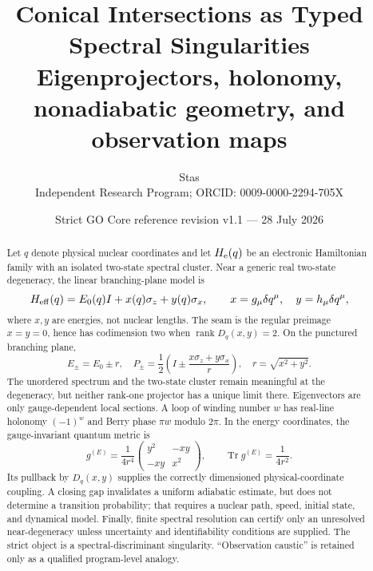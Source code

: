 \documentclass[11pt,a4paper]{article}
\title{\bfseries Conical Intersections as Typed Spectral Singularities\\
\large Eigenprojectors, holonomy, nonadiabatic geometry, and observation maps}
\author{Stas\\
\small Independent Research Program; ORCID: 0009-0000-2294-705X}
\date{Strict GO Core reference revision v1.1 --- 28 July 2026}
\theoremstyle{definition}
\theoremstyle{plain}
\theoremstyle{remark}
\newcommand{\Tr}{\operatorname{Tr}}
\newcommand{\rank}{\operatorname{rank}}
\begin{document}
\maketitle

\begin{center}
\end{center}

\begin{abstract}
Let \(q\) denote physical nuclear coordinates and let
\(H_{\rm e}(q)\) be an electronic Hamiltonian family with an isolated
two-state spectral cluster. Near a generic real two-state degeneracy,
the linear branching-plane model is
\[
H_{\rm eff}(q)=E_0(q)I+x(q)\sigma_z+y(q)\sigma_x,\qquad
x=g_\mu\delta q^\mu,\quad y=h_\mu\delta q^\mu,
\]
where \(x,y\) are energies, not nuclear lengths.  The seam is the
regular preimage \(x=y=0\), hence has codimension two when
\(\rank D_q(x,y)=2\).  On the punctured branching plane,
\[
E_\pm=E_0\pm r,\quad
P_\pm=\frac12\left(I\pm\frac{x\sigma_z+y\sigma_x}{r}\right),
\quad r=\sqrt{x^2+y^2}.
\]
The unordered spectrum and the two-state cluster remain meaningful at
the degeneracy, but neither rank-one projector has a unique limit
there. Eigenvectors are only gauge-dependent local sections.  A loop
of winding number \(w\) has real-line holonomy
\((-1)^w\) and Berry phase \(\pi w\) modulo \(2\pi\).  In the energy
coordinates, the gauge-invariant quantum metric is
\[
g^{(E)}=\frac1{4r^4}
\begin{pmatrix}y^2&-xy\\-xy&x^2\end{pmatrix},
\qquad \Tr g^{(E)}=\frac1{4r^2}.
\]
Its pullback by \(D_q(x,y)\) supplies the correctly dimensioned
physical-coordinate coupling. A closing gap invalidates a uniform
adiabatic estimate, but does not determine a transition probability;
that requires a nuclear path, speed, initial state, and dynamical
model. Finally, finite spectral resolution can certify only an
unresolved near-degeneracy unless uncertainty and identifiability
conditions are supplied. The strict object is a spectral-discriminant
singularity. ``Observation caustic'' is retained only as a qualified
program-level analogy.
\end{abstract}
\end{document}
